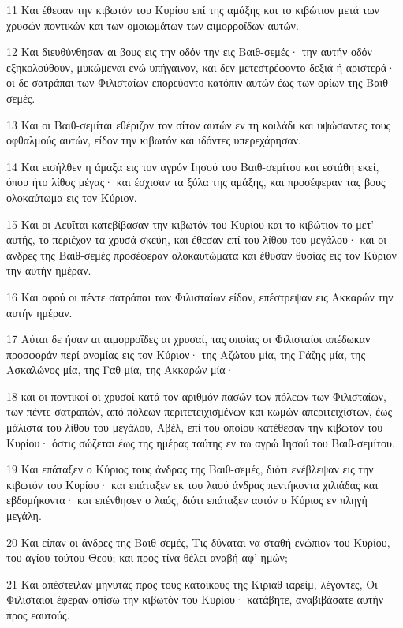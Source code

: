 \par 11 Και έθεσαν την κιβωτόν του Κυρίου επί της αμάξης και το κιβώτιον μετά των χρυσών ποντικών και των ομοιωμάτων των αιμορροΐδων αυτών.
\par 12 Και διευθύνθησαν αι βους εις την οδόν την εις Βαιθ-σεμές· την αυτήν οδόν εξηκολούθουν, μυκώμεναι ενώ υπήγαινον, και δεν μετεστρέφοντο δεξιά ή αριστερά· οι δε σατράπαι των Φιλισταίων επορεύοντο κατόπιν αυτών έως των ορίων της Βαιθ-σεμές.
\par 13 Και οι Βαιθ-σεμίται εθέριζον τον σίτον αυτών εν τη κοιλάδι και υψώσαντες τους οφθαλμούς αυτών, είδον την κιβωτόν και ιδόντες υπερεχάρησαν.
\par 14 Και εισήλθεν η άμαξα εις τον αγρόν Ιησού του Βαιθ-σεμίτου και εστάθη εκεί, όπου ήτο λίθος μέγας· και έσχισαν τα ξύλα της αμάξης, και προσέφεραν τας βους ολοκαύτωμα εις τον Κύριον.
\par 15 Και οι Λευΐται κατεβίβασαν την κιβωτόν του Κυρίου και το κιβώτιον το μετ' αυτής, το περιέχον τα χρυσά σκεύη, και έθεσαν επί του λίθου του μεγάλου· και οι άνδρες της Βαιθ-σεμές προσέφεραν ολοκαυτώματα και έθυσαν θυσίας εις τον Κύριον την αυτήν ημέραν.
\par 16 Και αφού οι πέντε σατράπαι των Φιλισταίων είδον, επέστρεψαν εις Ακκαρών την αυτήν ημέραν.
\par 17 Αύται δε ήσαν αι αιμορροΐδες αι χρυσαί, τας οποίας οι Φιλισταίοι απέδωκαν προσφοράν περί ανομίας εις τον Κύριον· της Αζώτου μία, της Γάζης μία, της Ασκαλώνος μία, της Γαθ μία, της Ακκαρών μία·
\par 18 και οι ποντικοί οι χρυσοί κατά τον αριθμόν πασών των πόλεων των Φιλισταίων, των πέντε σατραπών, από πόλεων περιτετειχισμένων και κωμών απεριτειχίστων, έως μάλιστα του λίθου του μεγάλου, Αβέλ, επί του οποίου κατέθεσαν την κιβωτόν του Κυρίου· όστις σώζεται έως της ημέρας ταύτης εν τω αγρώ Ιησού του Βαιθ-σεμίτου.
\par 19 Και επάταξεν ο Κύριος τους άνδρας της Βαιθ-σεμές, διότι ενέβλεψαν εις την κιβωτόν του Κυρίου· και επάταξεν εκ του λαού άνδρας πεντήκοντα χιλιάδας και εβδομήκοντα· και επένθησεν ο λαός, διότι επάταξεν αυτόν ο Κύριος εν πληγή μεγάλη.
\par 20 Και είπαν οι άνδρες της Βαιθ-σεμές, Τις δύναται να σταθή ενώπιον του Κυρίου, του αγίου τούτου Θεού; και προς τίνα θέλει αναβή αφ' ημών;
\par 21 Και απέστειλαν μηνυτάς προς τους κατοίκους της Κιριάθ ιαρείμ, λέγοντες, Οι Φιλισταίοι έφεραν οπίσω την κιβωτόν του Κυρίου· κατάβητε, αναβιβάσατε αυτήν προς εαυτούς.

